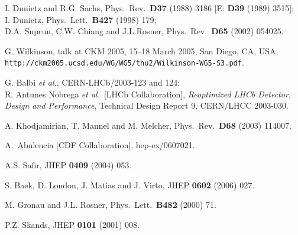 \documentclass[12pt]{article}
\begin{document}
\begin{thebibliography}{999}
I. Dunietz and R.G. Sachs,
{ Phys.\ Rev.}~{\bf D37} (1988) 3186  [E: {\bf D39} (1989) 3515];\\
I. Dunietz,
{ Phys.\ Lett.}~{\bf B427} (1998) 179;\\
D.A. Suprun, C.W. Chiang and J.L.Rosner,
{ Phys.\ Rev.}~{\bf D65} (2002) 054025.

G. Wilkinson, talk at CKM 2005, 
 15--18 March 2005, San Diego, CA, USA, \\
{\tt http://ckm2005.ucsd.edu/WG/WG5/thu2/Wilkinson-WG5-S3.pdf}.

G. Balbi {\it et al.}, CERN-LHCb/2003-123 and
124;\\
R. Antunes Nobrega {\it et al.}\ [LHCb Collaboration], {\it Reoptimized
LHCb Detector, Design and Performance}, Technical Design Report 9, 
CERN/LHCC 2003-030.

A. Khodjamirian, T. Mannel and M. Melcher,
{ Phys.\ Rev.}~{\bf D68} (2003) 114007.

A.~Abulencia  [CDF Collaboration],
  hep-ex/0607021.
  
 A.S. Safir,
  { JHEP} {\bf 0409} (2004) 053.

S. Baek, D. London, J. Matias and J. Virto,
  JHEP {\bf 0602} (2006) 027.

M. Gronau and J.L. Rosner,
{ Phys.\ Lett.}~{\bf B482} (2000) 71.

P.Z. Skands,
{ JHEP} {\bf 0101} (2001) 008.


\end{thebibliography}
\end{document}
